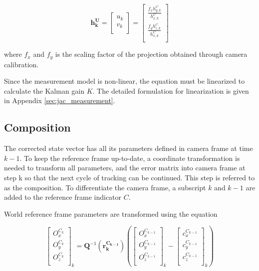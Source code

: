 \begin{equation}
\boldsymbol{h_{k}^{U}}= \begin{bmatrix}
u_{k} \\
v_{k} \\
\end{bmatrix}=\begin{bmatrix}
\frac{f_{x}h_{y,k}^{C}}{h_{x,k}^{C}} \\
\frac{f_{y}h_{z,k}^{C}}{h_{x,k}^{C}} \\
\end{bmatrix}
\end{equation}

\noindent where $f_{x}$ and $f_{y}$ is the scaling factor of the projection 
obtained through camera calibration.

Since the measurement model is non-linear, the equation must be
linearized to calculate the Kalman gain $K$. The detailed formulation for
linearization is given in Appendix \ref{sec:jac_measurement}.

\subsection{Composition}

The corrected state vector has all its parameters defined in camera
frame at time $k-1$. To keep the reference frame up-to-date, a coordinate
transformation is needed to transform all parameters, and the error matrix
into camera frame at step k so that the next cycle of tracking can be
continued. This step is referred to as the composition. To
differentiate the camera frame, a subscript $k$ and $k-1$ are added to
the reference frame indicator $C$.

World reference frame parameters are transformed using the equation

\begin{equation}
\begin{bmatrix}
O_{x}^{C_{k}} \\
O_{y}^{C_k} \\
O_{z}^{C_k} \\
\end{bmatrix}_{k}=\boldsymbol{Q}^{-1}(\boldsymbol{r_{k}^{C_{k-1}}})\left(
\begin{bmatrix}
O_{x}^{C_{k-1}} \\
O_{y}^{C_{k-1}} \\
O_{z}^{C_{k-1}} \\
\end{bmatrix}_{k}- \begin{bmatrix}
c_{x}^{C_{k-1}} \\
c_{y}^{C_{k-1}} \\
c_{z}^{C_{k-1}} \\
\end{bmatrix}_{k}\right)
\end{equation}

